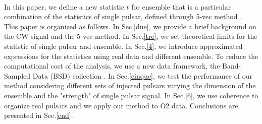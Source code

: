 \documentclass[11pt,a4paper,final]{iopart}
\begin{document}
\\In this paper, we define a new statistic $t$ for ensemble that is a particular combination of the statistics of single pulsar, defined through 5-vec method \cite{2010}.
\\This paper is organized as follows. In Sec.\ref{due}, we provide a brief background on the CW signal and the 5-vec method. In Sec.\ref{tre}, we set theoretical limits for the statistic of single pulsar and ensemble. In Sec.\ref{4}, we introduce approximated expressions for the statistics using real data and different ensemble. To reduce the computational cost of the analysis, we use a new data framework, the Band-Sampled Data (BSD) collection \cite{2019}.  In Sec.\ref{cinque},  we test the performance of our method considering different sets of injected pulsars varying the dimension of the ensemble and the "strength" of single pulsar signal. In Sec.\ref{6}, we use coherence to organize real pulsars and we apply our method to O2 data. Conclusions are presented in Sec.\ref{end}.

\end{document}
